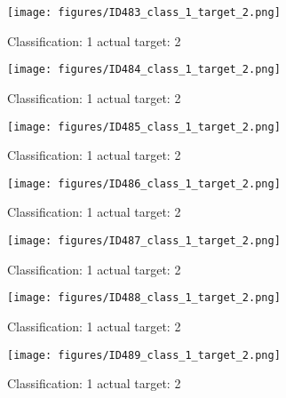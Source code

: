 \begin{figure}[h!]
\begin{center}
\texttt{[image: figures/ID483\_class\_1\_target\_2.png]}
\end{center}
\caption{ Classification: 1 actual target: 2}
\label{fig:ID483_class_1_target_2}
\end{figure}
\begin{figure}[h!]
\begin{center}
\texttt{[image: figures/ID484\_class\_1\_target\_2.png]}
\end{center}
\caption{ Classification: 1 actual target: 2}
\label{fig:ID484_class_1_target_2}
\end{figure}
\begin{figure}[h!]
\begin{center}
\texttt{[image: figures/ID485\_class\_1\_target\_2.png]}
\end{center}
\caption{ Classification: 1 actual target: 2}
\label{fig:ID485_class_1_target_2}
\end{figure}
\begin{figure}[h!]
\begin{center}
\texttt{[image: figures/ID486\_class\_1\_target\_2.png]}
\end{center}
\caption{ Classification: 1 actual target: 2}
\label{fig:ID486_class_1_target_2}
\end{figure}
\begin{figure}[h!]
\begin{center}
\texttt{[image: figures/ID487\_class\_1\_target\_2.png]}
\end{center}
\caption{ Classification: 1 actual target: 2}
\label{fig:ID487_class_1_target_2}
\end{figure}
\begin{figure}[h!]
\begin{center}
\texttt{[image: figures/ID488\_class\_1\_target\_2.png]}
\end{center}
\caption{ Classification: 1 actual target: 2}
\label{fig:ID488_class_1_target_2}
\end{figure}
\begin{figure}[h!]
\begin{center}
\texttt{[image: figures/ID489\_class\_1\_target\_2.png]}
\end{center}
\caption{ Classification: 1 actual target: 2}
\label{fig:ID489_class_1_target_2}
\end{figure}

